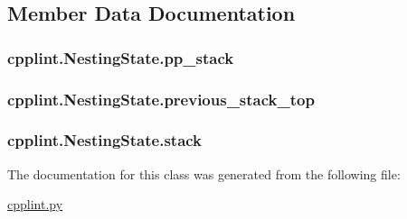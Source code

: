 \subsection{Member Data Documentation}
\subsubsection[{\texorpdfstring{pp\+\_\+stack}{pp_stack}}]{\setlength{\rightskip}{0pt plus 5cm}cpplint.\+Nesting\+State.\+pp\+\_\+stack}\hypertarget{classcpplint_1_1NestingState_a3a5ca37e3066d91830ea1faa8feae4e5}{}\label{classcpplint_1_1NestingState_a3a5ca37e3066d91830ea1faa8feae4e5}
\subsubsection[{\texorpdfstring{previous\+\_\+stack\+\_\+top}{previous_stack_top}}]{\setlength{\rightskip}{0pt plus 5cm}cpplint.\+Nesting\+State.\+previous\+\_\+stack\+\_\+top}\hypertarget{classcpplint_1_1NestingState_a7aa34c8fb8df73d76f702c7012c46911}{}\label{classcpplint_1_1NestingState_a7aa34c8fb8df73d76f702c7012c46911}
\subsubsection[{\texorpdfstring{stack}{stack}}]{\setlength{\rightskip}{0pt plus 5cm}cpplint.\+Nesting\+State.\+stack}\hypertarget{classcpplint_1_1NestingState_a6ae9bea040f988d152922788d0d73a15}{}\label{classcpplint_1_1NestingState_a6ae9bea040f988d152922788d0d73a15}


The documentation for this class was generated from the following file\+:\begin{DoxyCompactItemize}
\item 
\hyperlink{cpplint_8py}{cpplint.\+py}\end{DoxyCompactItemize}
